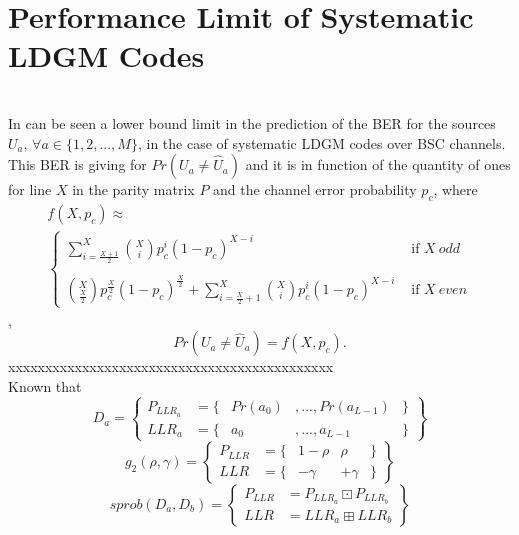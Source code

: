 \documentclass[journal]{IEEEtran}
\begin{document}
\section{Performance  Limit of Systematic LDGM Codes} 
\label{sec:Performance}
~\\
In \cite{art-garciafrias} can be seen a lower bound limit in the prediction 
of the BER for the sources $U_a$, $\forall a \in \{1, 2, ..., M\}$, 
in the case of systematic LDGM codes over BSC channels.
This BER is giving for $Pr(U_a \neq \hat{U}_a)$ and it is in function of the 
quantity of ones for line $X$ in the parity matrix  $P$ and the channel error 
probability $p_c$, where
 \small
 \begin{multline}\label{eq:gf1}
f(X,p_c) \approx \\ \left \{ \begin{matrix}
\sum\limits_{i=\frac{X+1}{2}}^{X} { \binom{X}{i} p_c^i (1-p_c)^{X-i} }  & \text{ if } X~odd \\ 
~ & ~\\
\binom{X}{\frac{X}{2}} p_c^{\frac{X}{2}} (1-p_c)^{\frac{X}{2}} + \sum\limits^{X}_{i=\frac{X}{2}+1} { \binom{X}{i} p_c^i (1-p_c)^{X-i} } & \text{ if } X~even 
\end{matrix} \right .
\end{multline},
\normalsize
\begin{equation}\label{eq:gf3}
 Pr(U_a \neq \hat{U}_a) = f(X,p_c).
\end{equation}
xxxxxxxxxxxxxxxxxxxxxxxxxxxxxxxxxxxxxxxxxxxx\\
Known that
\begin{equation}\label{eq:alg1}
 D_a=\left \{ 
 \begin{matrix}
P_{LLR_a}&= \{& Pr(a_{0})&, ..., Pr(a_{L-1}) &\}  \\
LLR_a  &= \{& a_0    &, ..., a_{L-1}         &\}  
 \end{matrix}
 \right \}
\end{equation}
\begin{equation}\label{eq:alg2}
 g_2(\rho, \gamma)=\left \{ 
 \begin{matrix}
P_{LLR}&= \{& 1-\rho   & \rho    & \}  \\
LLR    &= \{& -\gamma  & +\gamma & \} 
 \end{matrix}
 \right \}
\end{equation}
\begin{equation}\label{eq:alg3}
 sprob(D_a, D_b)=\left \{ 
 \begin{matrix}
P_{LLR}&= P_{LLR_a} \boxdot  P_{LLR_b}   \\
LLR    &= LLR_a     \boxplus LLR_b     
 \end{matrix}
 \right \}
\end{equation}
\end{document}
